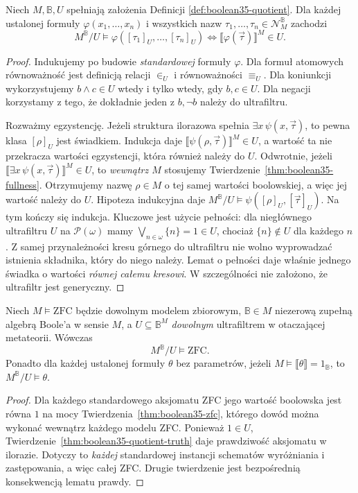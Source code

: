 \begin{twierdzenie}
\label{thm:boolean35-quotient-truth}
Niech $M,\mathbb B,U$ spełniają
założenia Definicji
\ref{def:boolean35-quotient}.
Dla każdej ustalonej formuły
$\varphi(x_1,\ldots,x_n)$ i
wszystkich nazw
$\tau_1,\ldots,\tau_n\in
\mathcal N_M^{\mathbb B}$
zachodzi
\[
 M^{\mathbb B}/U\models
  \varphi([\tau_1]_U,\ldots,[\tau_n]_U)
 \iff
 \llbracket\varphi(\vec\tau)\rrbracket^M\in U.
\]
\end{twierdzenie}
\begin{proof}
Indukujemy po budowie \emph{standardowej}
formuły $\varphi$.
Dla formuł atomowych równoważność
jest definicją relacji $\in_U$
i równoważności $\equiv_U$.
Dla koniunkcji wykorzystujemy
$b\wedge c\in U$ wtedy i tylko wtedy,
gdy $b,c\in U$.
Dla negacji korzystamy z tego,
że dokładnie jeden z
$b,\neg b$ należy do ultrafiltru.

Rozważmy egzystencję.
Jeżeli struktura ilorazowa
spełnia $\exists x\,\psi(x,\vec\tau)$,
to pewna klasa $[\rho]_U$
jest świadkiem. Indukcja daje
$\llbracket\psi(\rho,\vec\tau)\rrbracket^M
\in U$, a wartość ta nie
przekracza wartości egzystencji,
która również należy do $U$.
Odwrotnie, jeżeli
$\llbracket\exists x\,\psi(x,\vec\tau)
\rrbracket^M\in U$, to
\emph{wewnątrz $M$} stosujemy
Twierdzenie~\ref{thm:boolean35-fullness}.
Otrzymujemy nazwę $\rho\in M$
o tej samej wartości boolowskiej,
a więc jej wartość należy do $U$.
Hipoteza indukcyjna daje
$M^{\mathbb B}/U\models
\psi([\rho]_U,[\vec\tau]_U)$.
Na tym kończy się indukcja.
Kluczowe jest użycie pełności:
dla niegłównego ultrafiltru $U$
na $\mathcal P(\omega)$ mamy
$\bigvee_{n\in\omega}\{n\}=1\in U$,
chociaż $\{n\}\notin U$ dla każdego
$n$. Z samej przynależności kresu
górnego do ultrafiltru nie wolno
wyprowadzać istnienia składnika,
który do niego należy.
Lemat o pełności daje właśnie
jednego świadka o wartości
\emph{równej całemu kresowi}.
W szczególności nie założono,
że ultrafiltr jest generyczny.
\end{proof}

\begin{twierdzenie}
\label{thm:boolean35-quotient-zfc}
Niech $M\models\mathrm{ZFC}$
będzie dowolnym modelem zbiorowym,
$\mathbb B\in M$ niezerową
zupełną algebrą Boole'a w sensie
$M$, a $U\subseteq\mathbb B^M$
\emph{dowolnym} ultrafiltrem
w otaczającej metateorii.
Wówczas
\[
 M^{\mathbb B}/U\models\mathrm{ZFC}.
\]
Ponadto dla każdej ustalonej formuły
$\theta$ bez parametrów, jeżeli
$M\models
\llbracket\theta\rrbracket=1_{\mathbb B}$,
to $M^{\mathbb B}/U\models\theta$.
\end{twierdzenie}
\begin{proof}
Dla każdego standardowego aksjomatu
ZFC jego wartość boolowska jest
równa $1$ na mocy
Twierdzenia~\ref{thm:boolean35-zfc},
którego dowód można wykonać
wewnątrz każdego modelu ZFC.
Ponieważ $1\in U$,
Twierdzenie~\ref{thm:boolean35-quotient-truth}
daje prawdziwość aksjomatu
w ilorazie. Dotyczy to
\emph{każdej} standardowej
instancji schematów wyróżniania
i zastępowania, a więc całej ZFC.
Drugie twierdzenie jest
bezpośrednią konsekwencją
lematu prawdy.
\end{proof}

